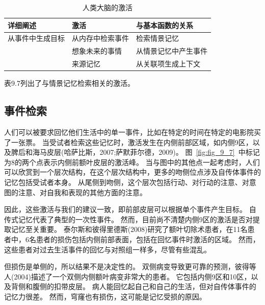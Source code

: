 \begin{table}[htbp] 
	\newcommand{\tabincell}[2]{\begin{tabular}{@{}#1@{}}#2\end{tabular}} %
	\centering
	\caption{人类大脑的激活\label{tab:9_7}}
	\renewcommand\arraystretch{1.5}	%
	\begin{tabular}{lll}
		\toprule
		详细阐述 & 激活 & 与基本函数的关系\\
		\midrule
		从事件中生成目标 & 从内存中检索事件 & 检索情景记忆  \\
		& 想象未来的事情 & 从情景记忆中产生事件 \\
		& 来源记忆 & 从关联项生成上下文 \\
		\bottomrule
		
	\end{tabular}%
\end{table}%


表9.7列出了与情景记忆检索相关的激活。



\subsection{事件检索}
人们可以被要求回忆他们生活中的单一事件，比如在特定的时间在特定的电影院买了一张票。
当受试者检索这些记忆时，激活发生在内侧前部区域，如内侧9区，以及脾后和海马皮层(哈萨比斯，2007;萨默菲尔德，2009)。
图~\ref{fig:fig_9_7}~中标记为8的两个点表示内侧前额叶皮层的激活峰。
当与图中的其他点一起考虑时，人们可以欣赏到一个层次结构，在这个层次结构中，更多的吻侧位点涉及自传体事件的记忆包括受试者本身。
从尾侧到吻侧，这个层次包括行动、对行动的注意、对意图的注意、对自我和表现的其他方面的注意。
\par


因此，这些激活与我们的建议一致，即前部皮层可以根据单个事件产生目标。
自传式记忆代表了典型的一次性事件。
然而，目前尚不清楚内侧9区的激活是否对提取记忆至关重要。
泰尔斯和彼得里德斯(2008)研究了额叶切除术患者，在11名患者中，6名患者的损伤包括内侧前部表面，包括在回忆事件时激活的区域。
然而，这些患者对过去生活事件的回忆与对照组一样多，尽管有些混乱。
\par


但损伤是单侧的，所以结果不是决定性的。
双侧病变导致更可靠的预测，彼得等人(2004)描述了一个双侧内侧额叶病变非常大的患者。
它包括内侧9区和10区，以及背侧和腹侧的扣带皮层。
病人能回忆起自己和自己的生活，但对自传体事件的记忆力很差。
然而，穹窿也有损伤，这可能是记忆受损的原因。
\par


